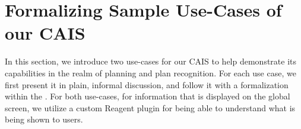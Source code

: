 \section{Formalizing Sample Use-Cases of our CAIS}\label{chap:use_cases}

In this section, we introduce two use-cases for our CAIS to help demonstrate
its capabilities in the realm of planning and plan recognition. For each
use case, we first present it in plain, informal discussion, and follow it
with a formalization within the \CEC. For both use-cases, for information that
is displayed on the global screen, we utilize a custom Reagent plugin for
being able to understand what is being shown to users.




